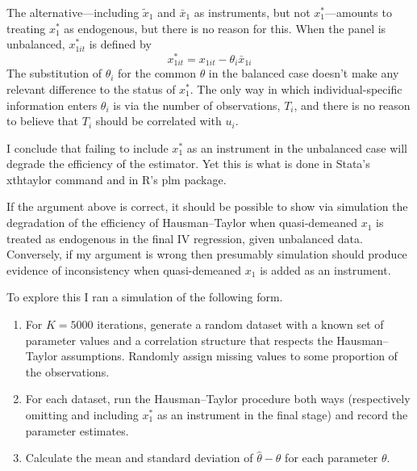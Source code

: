 \documentclass{article}
\begin{document}
The alternative---including $\tilde{x}_1$ and $\bar{x}_1$ as
instruments, but not $x_1^*$---amounts to treating $x_1^*$ as
endogenous, but there is no reason for this. When the panel is
unbalanced, $x^*_{1it}$ is defined by
\[
x^*_{1it} = x_{1it} - \theta_i \bar{x}_{1i}
\]
The substitution of $\theta_i$ for the common $\theta$ in the balanced
case doesn't make any relevant difference to the status of $x_1^*$.
The only way in which individual-specific information enters
$\theta_i$ is via the number of observations, $T_i$, and there is no
reason to believe that $T_i$ should be correlated with $u_i$.

I conclude that failing to include $x_1^*$ as an instrument in the
unbalanced case will degrade the efficiency of the estimator. Yet this
is what is done in Stata's \textsf{xthtaylor} command and in R's
\textsf{plm} package.

If the argument above is correct, it should be possible to show via
simulation the degradation of the efficiency of Hausman--Taylor when
quasi-demeaned $x_1$ is treated as endogenous in the final IV
regression, given unbalanced data. Conversely, if my argument
is wrong then presumably simulation should produce evidence of
inconsistency when quasi-demeaned $x_1$ is added as an instrument.

To explore this I ran a simulation of the following form. 
\begin{enumerate}
\item For $K = 5000$ iterations, generate a random dataset with a
  known set of parameter values and a correlation structure that
  respects the Hausman--Taylor assumptions. Randomly assign missing
  values to some proportion of the observations.
\item For each dataset, run the Hausman--Taylor procedure both ways
  (respectively omitting and including $x_1^*$ as an instrument in the
  final stage) and record the parameter estimates.
\item Calculate the mean and standard deviation of $\hat{\theta} -
  \theta$ for each parameter $\theta$.
\end{enumerate}
\end{document}
